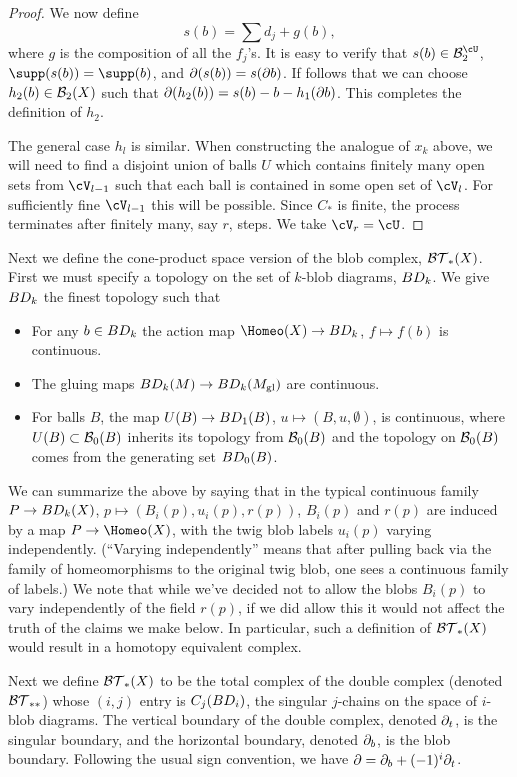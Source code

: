 \begin{proof}
We now define 
\[
	s(b) = \sum d_j + g(b),
\]
where $g$ is the composition of all the $f_j$'s.
It is easy to verify that $s(b) \in \sbc_2$, $\supp(s(b)) = \supp(b)$, and 
$\partial(s(b)) = s(\partial b)$.
If follows that we can choose $h_2(b)\in {\mathcal B}_2(X)$ such that $\partial(h_2(b)) = s(b) - b - h_1(\partial b)$.
This completes the definition of $h_2$.

The general case $h_l$ is similar.
When constructing the analogue of $x_k$ above, we will need to find a disjoint union of balls $U$
which contains finitely many open sets from $\cV_{l-1}$
such that each ball is contained in some open set of $\cV_l$.
For sufficiently fine $\cV_{l-1}$ this will be possible.
Since $C_*$ is finite, the process terminates after finitely many, say $r$, steps.
We take $\cV_r = \cU$.
\end{proof}


\medskip

Next we define the cone-product space version of the blob complex, ${\mathcal{BT}}_*(X)$.
First we must specify a topology on the set of $k$-blob diagrams, $BD_k$.
We give $BD_k$ the finest topology such that
\begin{itemize}
\item For any $b\in BD_k$ the action map $\Homeo(X) \to \BD_k$, $f \mapsto f(b)$ is continuous.
\item The gluing maps $BD_k(M)\to BD_k(M_\mathrm{gl})$ are continuous.
\item For balls $B$, the map $U(B) \to BD_1(B)$, $u\mapsto (B, u, \emptyset)$, is continuous,
where $U(B) \subset {\mathcal B}_0(B)$ inherits its topology from ${\mathcal B}_0(B)$ and the topology on
${\mathcal B}_0(B)$ comes from the generating set $BD_0(B)$.
\end{itemize}

We can summarize the above by saying that in the typical continuous family
$P\to BD_k(X)$, $p\mapsto \left(B_i(p), u_i(p), r(p)\right)$, $B_i(p)$ and $r(p)$ are induced by a map
$P\to \Homeo(X)$, with the twig blob labels $u_i(p)$ varying independently. 
(``Varying independently'' means that after pulling back via the family of homeomorphisms to the original twig blob, 
one sees a continuous family of labels.)
We note that while we've decided not to allow the blobs $B_i(p)$ to vary independently of the field $r(p)$,
if we did allow this it would not affect the truth of the claims we make below.
In particular, such a definition of ${\mathcal{BT}}_*(X)$ would result in a homotopy equivalent complex.

Next we define ${\mathcal{BT}}_*(X)$ to be the total complex of the double complex (denoted ${\mathcal{BT}}_{**}$) 
whose $(i,j)$ entry is $C_j(BD_i)$, the singular $j$-chains on the space of $i$-blob diagrams.
The vertical boundary of the double complex,
denoted $\partial_t$, is the singular boundary, and the horizontal boundary, denoted $\partial_b$, is
the blob boundary. Following the usual sign convention, we have $\partial = \partial_b + (-1)^i \partial_t$.

